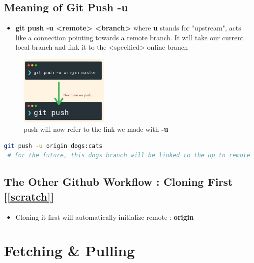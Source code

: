 \documentclass{report}
\begin{document}
\section{Meaning of Git Push -u}

\begin{itemize}
	\item \textbf{git push -u <remote> <branch>} where \textbf{u} stands for "upstream", acts like a connection pointing towards a remote branch. It will take our current local branch and link it to the <specified> online branch
\end{itemize}

\begin{figure}[H] 
	 \centering 
	 \includegraphics[width=1.7in]{screenshots/2022-07-07T20-52-46Z.png} 
	 \caption{push will now refer to the link we made with \textbf{-u}} 
 \end{figure}

 \begin{tcolorbox}[title=Playing with branches,colback=backcolour]
 \begin{lstlisting}[language=bash]
 git push -u origin dogs:cats
 # for the future, this dogs branch will be linked to the up to remote cats branch online. The dogs branch will also have an upstream referring to the cats branch
 \end{lstlisting}
 \end{tcolorbox}


\section{The Other Github Workflow : Cloning First [\ref{scratch}]}

\begin{itemize}
	\item Cloning it first will automatically initialize remote : \textbf{origin}
\end{itemize}



\chapter{Fetching \& Pulling}
\end{document}
